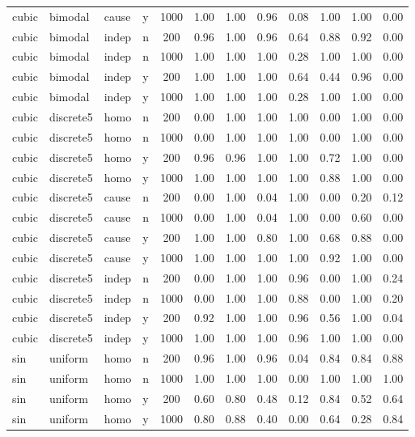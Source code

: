 \begin{longtable}{@{}lllccccccccc@{}}
cubic & bimodal & cause & y & 1000 & 1.00 & 1.00 & 0.96 & 0.08 & 1.00 & 1.00 & 0.00\\
cubic & bimodal & indep & n & 200 & 0.96 & 1.00 & 0.96 & 0.64 & 0.88 & 0.92 & 0.00\\
cubic & bimodal & indep & n & 1000 & 1.00 & 1.00 & 1.00 & 0.28 & 1.00 & 1.00 & 0.00\\
cubic & bimodal & indep & y & 200 & 1.00 & 1.00 & 1.00 & 0.64 & 0.44 & 0.96 & 0.00\\
cubic & bimodal & indep & y & 1000 & 1.00 & 1.00 & 1.00 & 0.28 & 1.00 & 1.00 & 0.00\\
cubic & discrete5 & homo & n & 200 & 0.00 & 1.00 & 1.00 & 1.00 & 0.00 & 1.00 & 0.00\\
cubic & discrete5 & homo & n & 1000 & 0.00 & 1.00 & 1.00 & 1.00 & 0.00 & 1.00 & 0.00\\
cubic & discrete5 & homo & y & 200 & 0.96 & 0.96 & 1.00 & 1.00 & 0.72 & 1.00 & 0.00\\
cubic & discrete5 & homo & y & 1000 & 1.00 & 1.00 & 1.00 & 1.00 & 0.88 & 1.00 & 0.00\\
cubic & discrete5 & cause & n & 200 & 0.00 & 1.00 & 0.04 & 1.00 & 0.00 & 0.20 & 0.12\\
cubic & discrete5 & cause & n & 1000 & 0.00 & 1.00 & 0.04 & 1.00 & 0.00 & 0.60 & 0.00\\
cubic & discrete5 & cause & y & 200 & 1.00 & 1.00 & 0.80 & 1.00 & 0.68 & 0.88 & 0.00\\
cubic & discrete5 & cause & y & 1000 & 1.00 & 1.00 & 1.00 & 1.00 & 0.92 & 1.00 & 0.00\\
cubic & discrete5 & indep & n & 200 & 0.00 & 1.00 & 1.00 & 0.96 & 0.00 & 1.00 & 0.24\\
cubic & discrete5 & indep & n & 1000 & 0.00 & 1.00 & 1.00 & 0.88 & 0.00 & 1.00 & 0.20\\
cubic & discrete5 & indep & y & 200 & 0.92 & 1.00 & 1.00 & 0.96 & 0.56 & 1.00 & 0.04\\
cubic & discrete5 & indep & y & 1000 & 1.00 & 1.00 & 1.00 & 0.96 & 1.00 & 1.00 & 0.00\\
sin & uniform & homo & n & 200 & 0.96 & 1.00 & 0.96 & 0.04 & 0.84 & 0.84 & 0.88\\
sin & uniform & homo & n & 1000 & 1.00 & 1.00 & 1.00 & 0.00 & 1.00 & 1.00 & 1.00\\
sin & uniform & homo & y & 200 & 0.60 & 0.80 & 0.48 & 0.12 & 0.84 & 0.52 & 0.64\\
sin & uniform & homo & y & 1000 & 0.80 & 0.88 & 0.40 & 0.00 & 0.64 & 0.28 & 0.84\\

\end{longtable}
